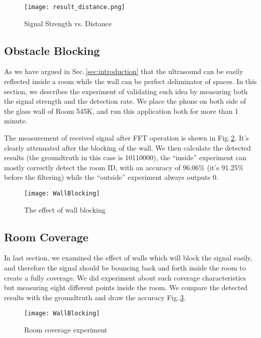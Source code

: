 \begin{figure}
  \centering
  \texttt{[image: result\_distance.png]}
  \caption{Signal Strength vs. Distance}
  \vspace{-0.3cm}
  \label{fig:strength}
\end{figure}

\subsection{Obstacle Blocking}
\label{sec:obstacle-blocking}
As we have argued in Sec.\,\ref{sec:introduction} that the ultrasound can be easily reflected inside a room while the wall can be perfect deliminator of spaces. In this section, we describes the experiment of validating such idea by measuring both the signal strength and the detection rate. We place the phone on both side of the glass wall of Room 545K, and run this application both for more than 1 minute. 

The measurement of received signal after FFT operation is shown in Fig.\,\ref{fig:wallblock}. It's clearly attenuated after the blocking of the wall. We then calculate the detected results (the groundtruth in this case is 10110000), the ``inside'' experiment can mostly correctly detect the room ID, with an accuracy of 96.06\% (it's 91.25\% before the filtering) while the ``outside'' experiment always outputs 0.

\begin{figure}
  \centering
  \texttt{[image: WallBlocking]}
  \vspace{-0.3cm}
  \caption{The effect of wall blocking}
  \label{fig:wallblock}
\end{figure}

\subsection{Room Coverage}
\label{sec:room-coverage}
In last section, we examined the effect of walls which will block the signal easily, and therefore the signal should be bouncing back and forth inside the room to create a fully coverage. We did experiment about such coverage characteristics but measuring eight different points inside the room. We compare the detected results with the groundtruth and draw the accuracy Fig.\,\ref{fig:coverage}.

\begin{figure}
  \centering
  \texttt{[image: WallBlocking]}
  \vspace{-0.3cm}
  \caption{Room coverage experiment}
  \label{fig:coverage}
\end{figure}

